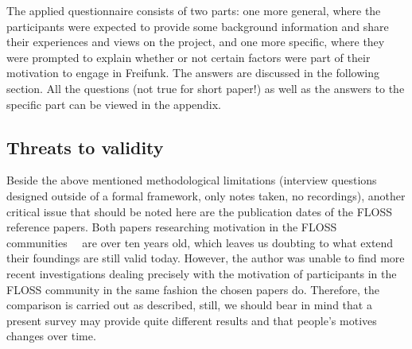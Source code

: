 The applied questionnaire consists of two parts: one more general, where the participants were expected to provide some background information and share their experiences and views on the project, and one more specific, where they were prompted to explain whether or not certain factors were part of their motivation to engage in Freifunk.
The answers are discussed in the following section.
All the questions (not true for short paper!) as well as the answers to the specific part can be viewed in the appendix.

\subsection{Threats to validity}
Beside the above mentioned methodological limitations (interview questions designed outside of a formal framework, only notes taken, no recordings),
another critical issue that should be noted here are the publication dates of the FLOSS reference papers.
Both papers researching motivation in the FLOSS communities~\cite{HarOu2002}~\cite{LakWo2005} are over ten years old, which leaves us doubting to what extend their foundings are still valid today.
However, the author was unable to find more recent investigations dealing precisely with the motivation of participants in the FLOSS community in the same fashion the chosen papers do.
Therefore, the comparison is carried out as described, still, we should bear in mind that a present survey may provide quite different results and that people's motives changes over time.

\begin{comment}
\begin{itemize}
  \item literature review for FLOSS <-- only as comparison
  \item semi-structured interviews for Freifunk <-- focus
    \begin{itemize}
      \item limitations of the methodology
    \end{itemize}
\end{itemize}
\end{comment}
